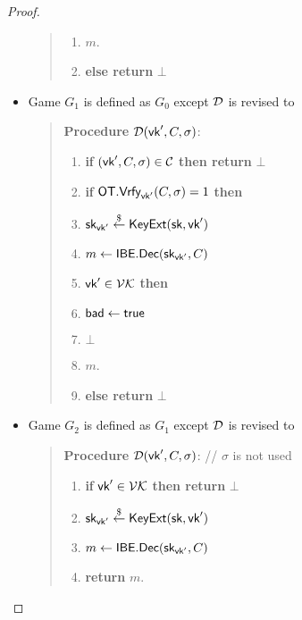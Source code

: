 \documentclass[12pt]{article}
\newcommand{\getsr}{\stackrel{\$}{\gets}}
\newcommand{\tab}{\hspace{0.3in}}
\newcommand{\Vrfy}{\textsf{Vrfy}}
\newcommand{\true}{\textsf{true}}
\newcommand{\C}{\mathcal{C}}
\theoremstyle{definition}
\newcommand{\Enc}{\textsf{Enc}}
\newcommand{\Dec}{\textsf{Dec}}
\newcommand{\pk}{\textsf{pk}}
\newcommand{\sk}{\textsf{sk}}
\newcommand{\LR}{\textsf{LR}}
\begin{document}
\begin{proof}
\begin{itemize}
\begin{quote}
\begin{enumerate}
\item \tab {\bf return} $m$.
\item {\bf else return} $\bot$
\end{enumerate}
\end{quote}
\item Game $G_1$ is defined as $G_0$ except $\mathcal{D}$ is revised to
\begin{quote}
{\bf Procedure} $\mathcal{D}(\textsf{vk}', C,\sigma)$:
\begin{enumerate}
\item {\bf if} $(\vk', C,\sigma) \in \C$ {\bf then return} $\bot$
\item {\bf if} $\OT.\Vrfy_{\vk'}(C,\sigma)=1$ {\bf then}
\item \tab $\sk_{\vk'} \getsr \KeyExt(\sk, \vk')$
\item \tab $m \gets \IBE.\Dec(\sk_{\vk'}, C)$
\item \tab {\bf if} $\textsf{vk}' \in \mathcal{VK}$ {\bf then}
\item \tab \tab \tab $\bad \gets \true$
\item \tab \tab \tab {\bf return} $\bot$
\item \tab {\bf return} $m$.
\item {\bf else return} $\bot$
\end{enumerate}
\end{quote}
\item Game $G_2$ is defined as $G_1$ except $\mathcal{D}$ is revised to
\begin{quote}
{\bf Procedure} $\mathcal{D}(\textsf{vk}', C,\sigma)$: // $\sigma$ is not used
\begin{enumerate}
\item {\bf if} $\textsf{vk}' \in \mathcal{VK}$ {\bf then return} $\bot$
\item $\sk_{\vk'} \getsr \KeyExt(\sk, \vk')$
\item $m \gets \IBE.\Dec(\sk_{\vk'}, C)$
\item {\bf return} $m$.
\end{enumerate}
\end{quote}

\end{itemize}
\end{proof}
\end{document}
